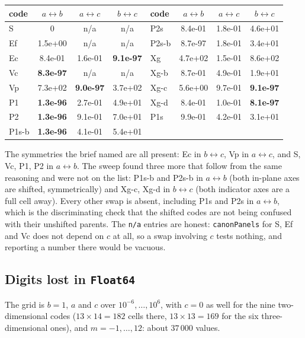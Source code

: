 \documentclass[11pt]{article}
\theoremstyle{remark}
\newcommand{\code}[1]{\texttt{#1}}
\begin{document}
\begin{center}\small
\begin{tabular}{@{}lccc@{\hskip 2em}lccc@{}}
\toprule
code & $a\!\leftrightarrow\! b$ & $a\!\leftrightarrow\! c$ & $b\!\leftrightarrow\! c$ &
code & $a\!\leftrightarrow\! b$ & $a\!\leftrightarrow\! c$ & $b\!\leftrightarrow\! c$\\
\midrule
S     & 0        & n/a & n/a & P2s   & 8.4e-01 & 1.8e-01 & 4.6e+01\\
Ef    & 1.5e+00 & n/a & n/a & P2s-b & 8.7e-97 & 1.8e-01 & 3.4e+01\\
Ec    & 8.4e-01 & 1.6e-01 & \textbf{9.1e-97} & Xg & 4.7e+02 & 1.5e-01 & 8.6e+02\\
Vc    & \textbf{8.3e-97} & n/a & n/a & Xg-b & 8.7e-01 & 4.9e-01 & 1.9e+01\\
Vp    & 7.3e+02 & \textbf{9.0e-97} & 3.7e+02 & Xg-c & 5.6e+00 & 9.7e-01 & \textbf{9.1e-97}\\
P1    & \textbf{1.3e-96} & 2.7e-01 & 4.9e+01 & Xg-d & 8.4e-01 & 1.0e-01 & \textbf{8.1e-97}\\
P2    & \textbf{1.3e-96} & 9.1e-01 & 7.0e+01 & P1s & 9.9e-01 & 4.2e-01 & 3.1e+01\\
P1s-b & \textbf{1.3e-96} & 4.1e-01 & 5.4e+01 & & & &\\
\bottomrule
\end{tabular}
\end{center}
\noindent
The symmetries the brief named are all present: Ec in $b\leftrightarrow c$, Vp in
$a\leftrightarrow c$, and S, Vc, P1, P2 in $a\leftrightarrow b$. The sweep found three
more that follow from the same reasoning and were not on the list: P1s-b and P2s-b in
$a\leftrightarrow b$ (both in-plane axes are shifted, symmetrically) and Xg-c, Xg-d in
$b\leftrightarrow c$ (both indicator axes are a full cell away). Every other swap is
absent, including P1s and P2s in $a\leftrightarrow b$, which is the discriminating check
that the shifted codes are not being confused with their unshifted parents. The
\code{n/a} entries are honest: \code{canonPanels} for S, Ef and Vc does not depend on $c$
at all, so a swap involving $c$ tests nothing, and reporting a number there would be
vacuous.

\subsection{Digits lost in \code{Float64}}

The grid is $b = 1$, $a$ and $c$ over $10^{-6},\ldots,10^{6}$, with $c = 0$ as well for
the nine two-dimensional codes ($13\times14 = 182$ cells there, $13\times13 = 169$ for the
six three-dimensional ones), and $m = -1,\ldots,12$: about $37\,000$ values.
\end{document}
